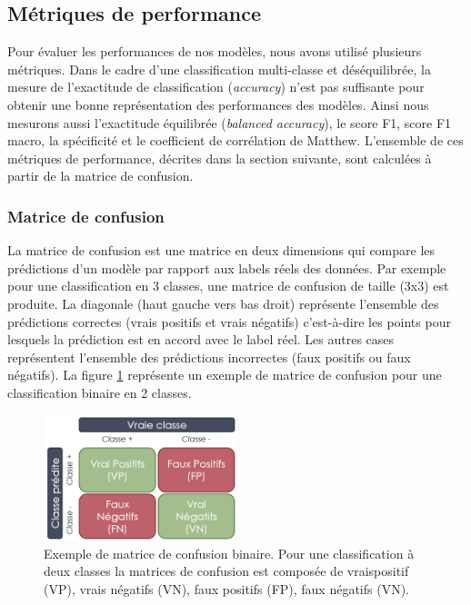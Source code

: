 \subsection{Métriques de performance}
Pour évaluer les performances de nos modèles, nous avons utilisé plusieurs métriques. Dans le cadre d'une classification multi-classe et déséquilibrée, la mesure de l'exactitude de classification (\textit{accuracy}) n'est pas suffisante pour obtenir une bonne représentation des performances des modèles. Ainsi nous mesurons aussi l'exactitude équilibrée (\textit{balanced accuracy}), le score F1, score F1 macro, la spécificité et le coefficient de corrélation de Matthew. L'ensemble de ces métriques de performance, décrites dans la section suivante, sont calculées à partir de la matrice de confusion.

\subsubsection{Matrice de confusion}
La matrice de confusion est une matrice en deux dimensions qui compare  les prédictions d'un modèle par rapport aux labels réels des données. Par exemple pour une classification en 3 classes, une matrice de confusion de taille (3x3) est produite. La diagonale (haut gauche vers bas droit) représente l'ensemble des prédictions correctes (vrais positifs et vrais négatifs) c'est-à-dire les points pour lesquels la prédiction est en accord avec le label réel. Les autres cases représentent l'ensemble des prédictions incorrectes (faux positifs ou faux négatifs). La figure \ref{fig:confusion-example}  représente un exemple de matrice de confusion pour une classification binaire en 2 classes.
\begin{figure}[!ht]
 \centering
 \includegraphics[width=0.5\textwidth]{figures/confusion_example.png}
 \caption[Exemple de matrice de confusion binaire]{Exemple de matrice de confusion binaire. Pour une classification à deux classes la matrices de confusion est composée de vraispositif (VP), vrais négatifs (VN), faux positifs (FP), faux négatifs (VN).}
 \label{fig:confusion-example}
\end{figure}

